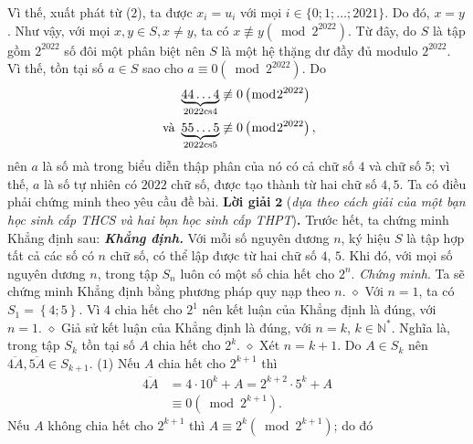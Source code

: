\begin{multicols}{2}
	\vskip 0.05cm
	Vì thế, xuất phát từ ($2$), ta được $x_i = u_i$  với mọi $i \in \{0; 1; \ldots; 2021\}$. Do đó, $x = y$.
	\vskip 0.05cm
	Như vậy, với mọi $x, y \in S, x \ne y$, ta có  \linebreak$x\not  \equiv y\left( {\bmod {2^{2022}}} \right)$. Từ đây, do $S$ là tập gồm $2^{2022}$ số đôi một phân biệt nên $S$ là một hệ thặng dư đầy đủ modulo $2^{2022}$.  Vì thế, tồn tại số $a \in S$ sao cho $a \equiv 0\left( {\bmod {2^{2022}}} \right).$  Do 
	\begin{align*}
		&\underbrace {44 \ldots 4}_{2022{\rm{cs}}4}\not  \equiv 0\left( {\bmod {2^{2022}}} \right)\\
		\text{ \color{black} và } &\underbrace {55 \ldots 5}_{2022{\rm{cs}}5}\not  \equiv 0\left( {\bmod {2^{2022}}} \right),
	\end{align*}
	nên $a$ là số mà trong biểu diễn thập phân của nó có cả chữ số $4$ và chữ số $5$; vì thế, $a$ là số tự nhiên có $2022$ chữ số, được tạo thành từ hai chữ số $4, 5$.
	\vskip 0.05cm
	Ta có điều phải chứng minh theo yêu cầu đề bài.
	\vskip 0.05cm
	\textbf{\color{thachthuctoanhoc}Lời giải} $\pmb{2}$ (\textit{dựa theo cách giải của một bạn học sinh cấp THCS và hai bạn học sinh cấp THPT})\textbf{\color{thachthuctoanhoc}.}
	\vskip 0.05cm
	Trước hết, ta chứng minh Khẳng định sau:
	\vskip 0.05cm
	\textbf{\color{thachthuctoanhoc}\textit{Khẳng định.}} Với mỗi số nguyên dương $n$, ký hiệu $S$  là tập hợp tất cả các số có $n$ chữ số, có thể lập được từ hai chữ số $4$, $5$. Khi đó, với mọi số nguyên dương $n$, trong tập $S_n$   luôn có một số chia hết cho $2^n$.
	 \vskip 0.05cm
	\textit{Chứng minh}. Ta sẽ chứng minh Khẳng định bằng phương pháp quy nạp theo $n$.
	\vskip 0.05cm
	$\diamond$ Với $n = 1$, ta có ${S_1} = \left\{ {4;5} \right\}$.  Vì $4$ chia hết cho $2^1$  nên kết luận của Khẳng định là đúng, với $n = 1$.
	\vskip 0.05cm
	$\diamond$ Giả sử kết luận của Khẳng định là đúng, với $n = k$, $k \in \mathbb{N^*}$. Nghĩa là, trong tập $S_k$  tồn tại số $A$ chia hết cho $2^k$.
	\vskip 0.05cm 
	$\diamond$ Xét $n = k + 1$.
	\vskip 0.05cm
	Do $A \in S_k$  nên  $\overline {4A} ,\overline {5A}  \in {S_{k + 1}}$. \hfill ($1$)
	\vskip 0.05cm
	Nếu $A$ chia hết cho $2^{k+1}$  thì
	\begin{align*}
		\overline {4A}  &= 4 \cdot {10^k} + A = {2^{k + 2}} \cdot {5^k} + A \\
		&\equiv 0\left( {\bmod {2^{k + 1}}} \right). \tag{$2$}
	\end{align*}
	Nếu $A$ không chia hết cho $2^{k+1}$  thì  \linebreak$A \equiv {2^k}\left( {\bmod {2^{k + 1}}} \right)$; do đó

\end{multicols}
